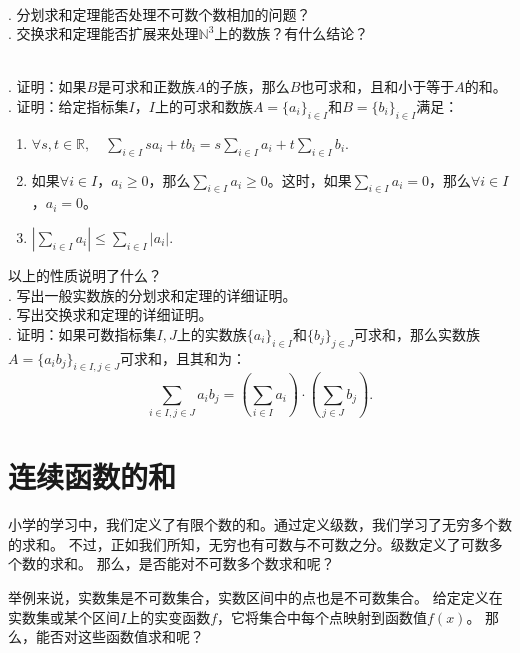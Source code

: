 \documentclass[12pt,UTF8]{ctexbook}
\begin{document}
\begin{sk}
    \mbox{} \\
    . 分划求和定理能否处理不可数个数相加的问题？\\
    . 交换求和定理能否扩展来处理$\mathbb{N}^3$上的数族？有什么结论？
\end{sk}

\begin{xt}
    \mbox{} \\
    . 证明：如果$B$是可求和正数族$A$的子族，那么$B$也可求和，且和小于等于$A$的和。\\
    . 证明：给定指标集$I$，$I$上的可求和数族$A = \{a_i\}_{i\in I}$和$B = \{b_i\}_{i\in I}$满足：
    \begin{enumerate}
        \item $\displaystyle \forall s, t\in\mathbb{R}, \quad \sum_{i\in I} sa_i + tb_i = s\sum_{i\in I} a_i + t \sum_{i\in I} b_i.$
        \item 如果$\forall i\in I$，$a_i \geqslant 0$，那么$\sum_{i\in I} a_i \geqslant 0$。这时，如果$\sum_{i\in I} a_i = 0$，那么$\forall i\in I$，$a_i = 0$。
        \item $\left| \sum_{i\in I} a_i \right| \leqslant \sum_{i\in I} |a_i|. $
    \end{enumerate}
    \indent 以上的性质说明了什么？\\
    . 写出一般实数族的分划求和定理的详细证明。\\
    . 写出交换求和定理的详细证明。\\
    . 证明：如果可数指标集$I,J$上的实数族$\{a_i\}_{i\in I}$和$\{b_j\}_{j\in J}$可求和，那么实数族$A = \{a_ib_j\}_{i\in I, j\in J}$可求和，且其和为：
    $$ \sum_{i\in I, j\in J} a_i b_j = \left(\sum_{i\in I} a_i\right) \cdot \left(\sum_{j\in J} b_j\right). $$
\end{xt}


\chapter{连续函数的和}

小学的学习中，我们定义了有限个数的和。通过定义级数，我们学习了无穷多个数的求和。
不过，正如我们所知，无穷也有可数与不可数之分。级数定义了可数多个数的求和。
那么，是否能对不可数多个数求和呢？

举例来说，实数集是不可数集合，实数区间中的点也是不可数集合。
给定定义在实数集或某个区间$I$上的实变函数$f$，它将集合中每个点映射到函数值$f(x)$。
那么，能否对这些函数值求和呢？
\end{document}
